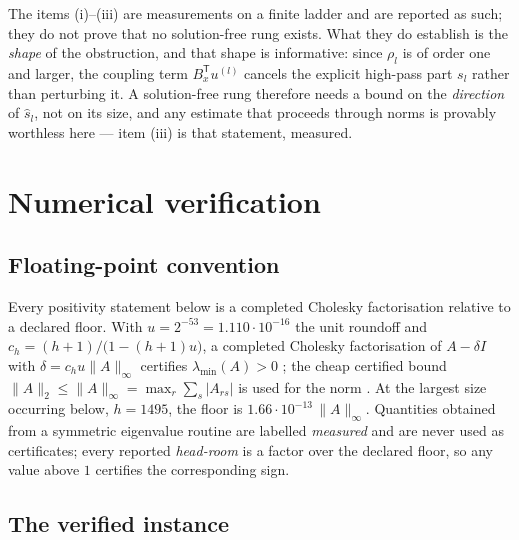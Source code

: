 \documentclass[11pt,a4paper]{article}
\theoremstyle{plain}
\theoremstyle{definition}
\newcommand{\T}{\mathsf{T}}
\newcommand{\lmin}{\lambda_{\min}}
\newcommand{\shat}{\widehat{s}}
\begin{document}
The items (i)--(iii) are measurements on a finite ladder and are reported as such;
they do not prove that no solution-free rung exists. What they do establish is the
\emph{shape} of the obstruction, and that shape is informative: since $\rho_{l}$ is of
order one and larger, the coupling term $B_{x}^{\T}u^{(l)}$ cancels the explicit
high-pass part $s_{l}$ rather than perturbing it. A solution-free rung therefore needs
a bound on the \emph{direction} of $\shat_{l}$, not on its size, and any estimate that
proceeds through norms is provably worthless here --- item (iii) is that statement,
measured.

\section{Numerical verification}
\label{sec:numerics}

\subsection{Floating-point convention}

Every positivity statement below is a completed Cholesky factorisation relative to a
declared floor. With $u=2^{-53}=1.110\cdot10^{-16}$ the unit roundoff and
$c_{h}=(h+1)/\bigl(1-(h+1)u\bigr)$, a completed Cholesky factorisation of
$A-\delta I$ with $\delta=c_{h}u\|A\|_{\infty}$ certifies $\lmin(A)>0$
\cite{Wilkinson1963,Higham2002}; the cheap certified bound
$\|A\|_{2}\le\|A\|_{\infty}=\max_{r}\sum_{s}|A_{rs}|$ is used for the norm
\cite{Gershgorin1931}. At the largest size occurring below, $h=1495$, the floor is
$1.66\cdot10^{-13}\,\|A\|_{\infty}$. Quantities obtained from a symmetric eigenvalue
routine are labelled \emph{measured} and are never used as certificates; every
reported \emph{head-room} is a factor over the declared floor, so any value above $1$
certifies the corresponding sign.

\subsection{The verified instance}
\end{document}

